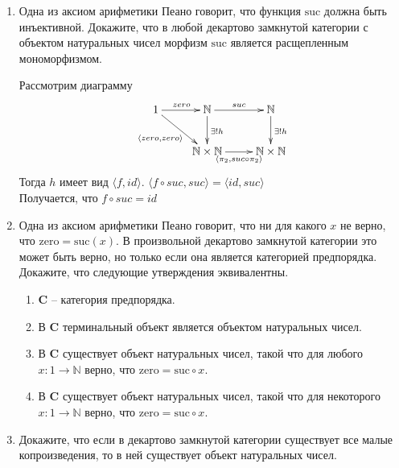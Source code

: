 \documentclass[draft]{article}
\newcommand{\cat}[1]{\mathbf{#1}}
\renewcommand{\C}{\cat{C}}
\newcommand{\zero}{\mathrm{zero}}
\newcommand{\suc}{\mathrm{suc}}
\begin{document}
\begin{enumerate}
\item Одна из аксиом арифметики Пеано говорит, что функция $\suc$ должна быть инъективной.
Докажите, что в любой декартово замкнутой категории с объектом натуральных чисел морфизм $\suc$ является расщепленным мономорфизмом.

Рассмотрим диаграмму
\[ \xymatrix{ 
1 \ar[dr]_{\langle zero, zero\rangle} \ar[r]^{zero} & \mathbb{N} \ar[d]^{\exists! h} \ar[r]^{suc} & \mathbb{N}\ar[d]^{\exists! h} \\
& \mathbb{N} \times \mathbb{N}  \ar[r]_{\langle \pi_2, suc \circ \pi_2\rangle} & \mathbb{N} \times \mathbb{N} 
            } \]
Тогда $h$ имеет вид $\langle f, id\rangle$. $\langle f\circ suc, suc \rangle = \langle id , suc \rangle$\\
Получается, что $f \circ suc = id$

\item Одна из аксиом арифметики Пеано говорит, что ни для какого $x$ не верно, что $\zero = \suc(x)$.
В произвольной декартово замкнутой категории это может быть верно, но только если она является категорией предпорядка.
Докажите, что следующие утверждения эквивалентны.
\begin{enumerate}
\item $\C$ -- категория предпорядка.\\

\item В $\C$ терминальный объект является объектом натуральных чисел.
\item В $\C$ существует объект натуральных чисел, такой что для любого $x : 1 \to \mathbb{N}$ верно, что $\zero = \suc \circ x$.
\item В $\C$ существует объект натуральных чисел, такой что для некоторого $x : 1 \to \mathbb{N}$ верно, что $\zero = \suc \circ x$.
\end{enumerate}

\item Докажите, что если в декартово замкнутой категории существует все малые копроизведения, то в ней существует объект натуральных чисел.


\end{enumerate}
\end{document}
